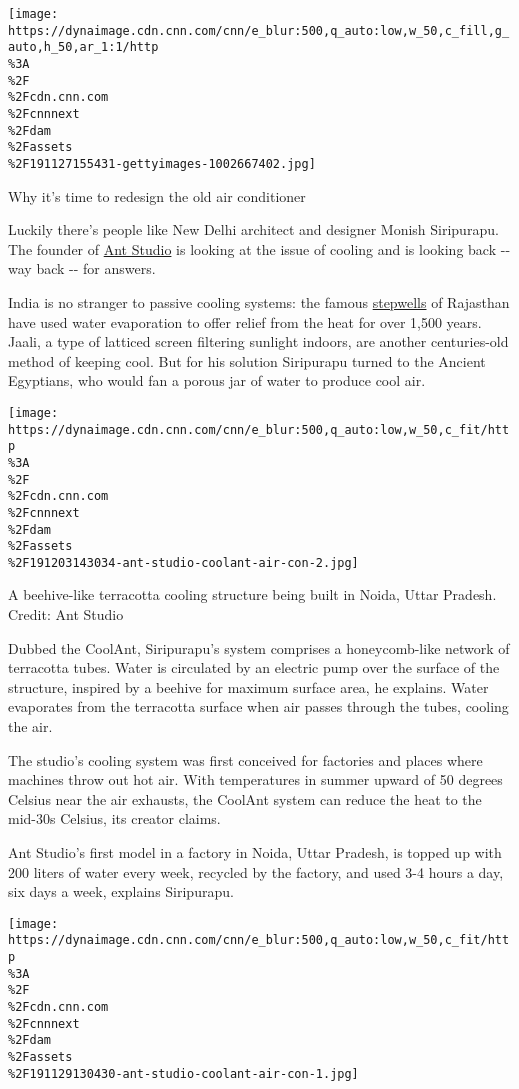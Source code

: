 \href{/style/article/global-cooling-prize-india/index.html}{}

\texttt{[image: https://dynaimage.cdn.cnn.com/cnn/e\_blur:500,q\_auto:low,w\_50,c\_fill,g\_auto,h\_50,ar\_1:1/http\\\%3A\\\%2F\\\%2Fcdn.cnn.com\\\%2Fcnnnext\\\%2Fdam\\\%2Fassets\\\%2F191127155431-gettyimages-1002667402.jpg]}

Why it's time to redesign the old air conditioner

Luckily there's people like New Delhi architect and designer Monish
Siripurapu. The founder of \href{http://www.ant.studio/}{Ant Studio} is
looking at the issue of cooling and is looking back -\/- way back -\/-
for answers.

India is no stranger to passive cooling systems: the famous
\href{https://cnn.com/2012/02/28/world/asia/ancient-air-conditioning-architecture/index.html}{stepwells}
of Rajasthan have used water evaporation to offer relief from the heat
for over 1,500 years. Jaali, a type of latticed screen filtering
sunlight indoors, are another centuries-old method of keeping cool. But
for his solution Siripurapu turned to the Ancient Egyptians, who would
fan a porous jar of water to produce cool air.

\texttt{[image: https://dynaimage.cdn.cnn.com/cnn/e\_blur:500,q\_auto:low,w\_50,c\_fit/http\\\%3A\\\%2F\\\%2Fcdn.cnn.com\\\%2Fcnnnext\\\%2Fdam\\\%2Fassets\\\%2F191203143034-ant-studio-coolant-air-con-2.jpg]}

A beehive-like terracotta cooling structure being built in Noida, Uttar
Pradesh. Credit: Ant Studio

Dubbed the CoolAnt, Siripurapu's system comprises a honeycomb-like
network of terracotta tubes. Water is circulated by an electric pump
over the surface of the structure, inspired by a beehive for maximum
surface area, he explains. Water evaporates from the terracotta surface
when air passes through the tubes, cooling the air.

The studio's cooling system was first conceived for factories and places
where machines throw out hot air. With temperatures in summer upward of
50 degrees Celsius near the air exhausts, the CoolAnt system can reduce
the heat to the mid-30s Celsius, its creator claims.

Ant Studio's first model in a factory in Noida, Uttar Pradesh, is topped
up with 200 liters of water every week, recycled by the factory, and
used 3-4 hours a day, six days a week, explains Siripurapu.

\texttt{[image: https://dynaimage.cdn.cnn.com/cnn/e\_blur:500,q\_auto:low,w\_50,c\_fit/http\\\%3A\\\%2F\\\%2Fcdn.cnn.com\\\%2Fcnnnext\\\%2Fdam\\\%2Fassets\\\%2F191129130430-ant-studio-coolant-air-con-1.jpg]}

